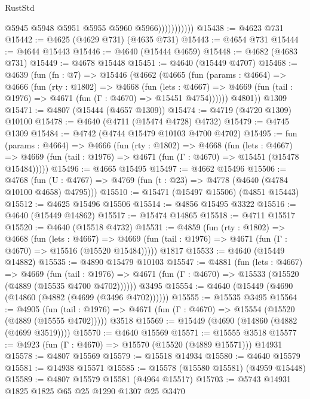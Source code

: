 \begin{lexlean}{RustStd}
\begin{coremodule}
                          @5945
                          @5948
                          @5951
                          @5955
                          @5960
                          @5966)))))))))))
@15438 := @4623 @731
@15442 := @4625 (@4629 @731) (@4635 @731)
@15443 := @4654 @731
@15444 := @4644 @15443
@15446 := @4640 (@15444 @4659)
@15448 := @4682 (@4683 @731)
@15449 := @4678 @15448
@15451 := @4640 (@15449 @4707)
@15468 := @4639
    (fun (fn : @7) =>
    @15446
      (@4662
        (@4665
          (fun (params : @4664) =>
          @4666
            (fun (rty : @1802) =>
            @4668
              (fun (lets : @4667) =>
              @4669 (fun (tail : @1976) => @4671 (fun (Γ : @4670) => @15451 @4754))))))
        @4801))
    @1309
@15471 := @4807 (@15444 (@4657 @1309))
@15474 := @4719 (@4720 @1309) @10100
@15478 := @4640 (@4711 (@15474 @4728) @4732)
@15479 := @4745 @1309
@15484 := @4742 (@4744 @15479 @10103 @4700 @4702)
@15495 := fun (params : @4664) =>
  @4666
    (fun (rty : @1802) =>
    @4668
      (fun (lets : @4667) =>
      @4669 (fun (tail : @1976) => @4671 (fun (Γ : @4670) => @15451 (@15478 @15484)))))
@15496 := @4665 @15495
@15497 := @4662 @15496
@15506 := @4768
    (fun (U : @4767) => @4769 (fun (t : @23) => @4778 (@4640 (@4784 @10100 @4658) @4795)))
@15510 := @15471 (@15497 @15506) (@4851 @15443)
@15512 := @4625 @15496 @15506
@15514 := @4856 @15495 @3322
@15516 := @4640 (@15449 @14862)
@15517 := @15474 @14865
@15518 := @4711 @15517
@15520 := @4640 (@15518 @4732)
@15531 := @4859
    (fun (rty : @1802) =>
    @4668
      (fun (lets : @4667) =>
      @4669 (fun (tail : @1976) => @4671 (fun (Γ : @4670) => @15516 (@15520 @15484)))))
    @1817
@15533 := @4640 (@15449 @14882)
@15535 := @4890 @15479 @10103
@15547 := @4881
    (fun (lets : @4667) =>
    @4669
      (fun (tail : @1976) =>
      @4671 (fun (Γ : @4670) => @15533 (@15520 (@4889 (@15535 @4700 @4702))))))
    @3495
@15554 := @4640 (@15449 (@4690 (@14860 (@4882 (@4699 (@3496 @4702))))))
@15555 := @15535 @3495
@15564 := @4905
    (fun (tail : @1976) => @4671 (fun (Γ : @4670) => @15554 (@15520 (@4889 (@15555 @4702)))))
    @3518
@15569 := @15449 (@4690 (@14860 (@4882 (@4699 @3519))))
@15570 := @4640 @15569
@15571 := @15555 @3518
@15577 := @4923 (fun (Γ : @4670) => @15570 (@15520 (@4889 @15571))) @14931
@15578 := @4807 @15569
@15579 := @15518 @14934
@15580 := @4640 @15579
@15581 := @14938 @15571
@15585 := @15578 (@15580 @15581) (@4959 @15448)
@15589 := @4807 @15579 @15581 (@4964 @15517)
@15703 := @5743
    @14931
    @1825
    @1825
    @65
    @25
    @1290
    @1307
    @25
    @3470

\end{coremodule}
\end{lexlean}
